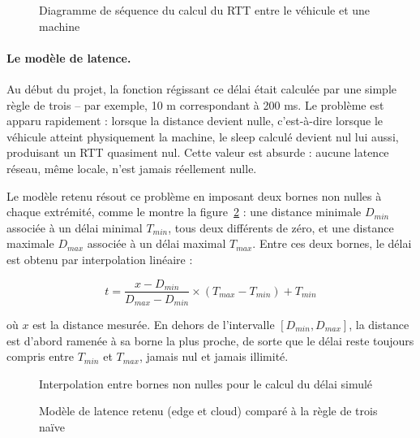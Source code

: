 \begin{figure}[H]
    \centering
    \caption{Diagramme de séquence du calcul du RTT entre le véhicule et une machine}
    \label{fig:calcul-rtt}
\end{figure}

\paragraph{Le modèle de latence.} Au début du projet, la fonction régissant ce délai était calculée par une simple règle de trois -- par exemple, 10 m correspondant à 200 ms. Le problème est apparu rapidement : lorsque la distance devient nulle, c'est-à-dire lorsque le véhicule atteint physiquement la machine, le sleep calculé devient nul lui aussi, produisant un RTT quasiment nul. Cette valeur est absurde : aucune latence réseau, même locale, n'est jamais réellement nulle.

Le modèle retenu résout ce problème en imposant deux bornes non nulles à chaque extrémité, comme le montre la figure~\ref{fig:calcul-sleep-formule} : une distance minimale $D_{min}$ associée à un délai minimal $T_{min}$, tous deux différents de zéro, et une distance maximale $D_{max}$ associée à un délai maximal $T_{max}$. Entre ces deux bornes, le délai est obtenu par interpolation linéaire :

\begin{equation}
t = \frac{x - D_{min}}{D_{max} - D_{min}} \times (T_{max} - T_{min}) + T_{min}
\label{eq:sleep-formule}
\end{equation}

où $x$ est la distance mesurée. En dehors de l'intervalle $[D_{min}, D_{max}]$, la distance est d'abord ramenée à sa borne la plus proche, de sorte que le délai reste toujours compris entre $T_{min}$ et $T_{max}$, jamais nul et jamais illimité.

\begin{figure}[H]
    \centering
    \caption{Interpolation entre bornes non nulles pour le calcul du délai simulé}
    \label{fig:calcul-sleep-formule}
\end{figure}

\begin{figure}[H]
    \centering
    \caption{Modèle de latence retenu (edge et cloud) comparé à la règle de trois naïve}
    \label{fig:latence-regle-trois}
\end{figure}


